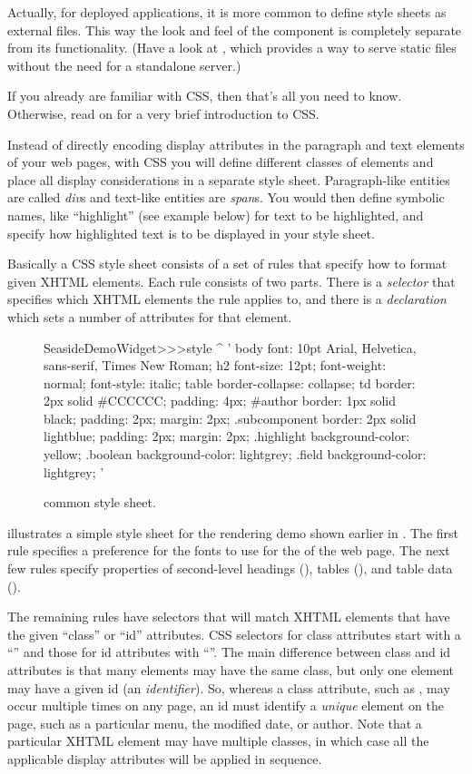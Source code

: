 \documentclass[a4paper,10pt,twoside]{book}
\begin{document}
{{Actually, for deployed applications, it is more common to define style sheets as external files.
This way the look and feel of the component is completely separate from its functionality.
(Have a look at , which provides a way to serve static files without the need for a standalone server.)

If you already are familiar with CSS, then that's all you need to know.
Otherwise, read on for a very brief introduction to CSS.

Instead of directly encoding display attributes in the paragraph and text elements of your web pages, with CSS you will define different classes of elements and place all display considerations in a separate style sheet.
Paragraph-like entities are called \emph{div}s and text-like entities are \emph{span}s.
You would then define symbolic names, like ``highlight'' (see example below) for text to be highlighted, and specify how highlighted text is to be displayed in your style sheet.

Basically a CSS style sheet consists of a set of rules that specify how to format given XHTML elements.
Each rule consists of two parts.
There is a \emph{selector} that specifies which XHTML elements the rule applies to, and there is a \emph{declaration} which sets a number of attributes for that element.

\begin{figure}[tb]
\begin{code}{}
SeasideDemoWidget>>>style
	^ '
body {
	font: 10pt Arial, Helvetica, sans-serif, Times New Roman;
}
h2 {
	font-size: 12pt;
	font-weight: normal;
	font-style: italic;
}
table { border-collapse: collapse; }
td {
	border: 2px solid #CCCCCC;
	padding: 4px;
}
#author {
	border: 1px solid black;
	padding: 2px;
	margin: 2px;
}
.subcomponent {
	border: 2px solid lightblue;
	padding: 2px;
	margin: 2px;
}
.highlight { background-color: yellow; }
.boolean { background-color: lightgrey; }
.field { background-color: lightgrey; }
'
\end{code}
\caption{ common style sheet.
}
\end{figure}
 illustrates a simple style sheet for the rendering demo shown earlier in .
The first rule specifies a preference for the fonts to use for the  of the web page.
The next few rules specify properties of second-level headings (), tables (), and table data ().

The remaining rules have selectors that will match XHTML elements that have the given ``class'' or ``id'' attributes.
CSS selectors for class attributes start with a ``'' and those for id attributes with ``\ct{#}''.
The main difference between class and id attributes is that many elements may have the same class, but only one element may have a given id (\ie an \emph{identifier}). 
So, whereas a class attribute, such as , may occur multiple times on any page, an id must identify a \emph{unique} element on the page, such as a particular menu, the modified date, or author.
Note that a particular XHTML element may have multiple classes, in which case all the applicable display attributes will be applied in sequence.

}}
\end{document}
